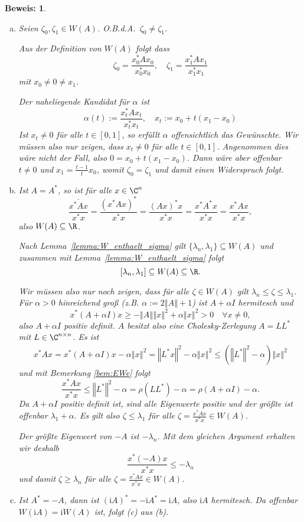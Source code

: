 \documentclass[
]{mycourse}
\theoremstyle{mythm}
\theoremstyle{break}
\newtheorem*{beweis}{Beweis:}
\newcommand{\norm}[1]{\left\Vert#1\right\Vert}		%
\renewcommand{\im}{\ensuremath{\mathrm{i}}} 			      	%
\begin{document}
\begin{beweis}
\begin{enumerate}[(a)]
\item Seien $\zeta_0, \zeta_1\in W(A)$. O.B.d.A.\ $\zeta_0\neq \zeta_1$. 

Aus der Definition von $W(A)$ folgt dass
\[
\zeta_0=\frac{x_0^* A x_0}{x_0^*x_0}, \quad \zeta_1=\frac{x_1^* A x_1}{x_1^*x_1}
\]
mit $x_0\neq 0 \neq x_1$. 

Der naheliegende Kandidat für $\alpha$ ist
\[
\alpha(t):=\frac{x_t^* A x_t}{x_t^*x_t}, \quad x_t:=x_0+t(x_1-x_0)
\]
Ist $x_t\neq 0$ für alle $t\in [0,1]$, so erfüllt $\alpha$ offensichtlich das Gewünschte.
Wir müssen also nur zeigen, dass $x_t\neq 0$ für alle $t\in [0,1]$.
Angenommen dies wäre nicht der Fall, also $0=x_0+t(x_1-x_0)$. Dann wäre 
aber offenbar $t\neq 0$ und $x_1=\frac{t-1}{t} x_0$, womit $\zeta_0=\zeta_1$ und damit 
einen Widerspruch folgt.
%
\item Ist $A=A^*$, so ist für alle $x\in \C^n$
\[
\overline{\frac{x^* A x}{x^*x}}=\frac{( x^* A x )^*}{x^*x}
= \frac{ (A x)^* x}{x^*x}=\frac{ x^* A^* x}{x^*x}
=\frac{ x^* A x}{x^*x},
\]
also $W(A)\subseteq \R$.

Nach Lemma~\ref{lemma:W_enthaelt_sigma} gilt $\{\lambda_n,\lambda_1\}\subseteq W(A)$ und
zusammen mit Lemma~\ref{lemma:W_enthaelt_sigma} folgt 
\[
[\lambda_n,\lambda_1]\subseteq W(A)\subseteq \R.
\] 
 
Wir müssen also nur noch zeigen, dass für alle $\zeta\in W(A)$ gilt $\lambda_n\leq \zeta\leq \lambda_1$.
Für $\alpha>0$ hinreichend groß (z.B. $\alpha:=2\norm{A}+1$) ist $A+\alpha I$ hermitesch und 
\[
x^*(A+\alpha I)x\geq -\norm{A}\norm{x}^2 + \alpha \norm{x}^2>0 \quad \forall x\neq 0,
\]
also $A+\alpha I$ positiv definit. $A$ besitzt also eine Cholesky-Zerlegung $A=LL^*$ mit $L\in \C^{n\times n}$.
Es ist
\begin{align*}
x^*A x = x^* (A+\alpha I) x- \alpha \norm{x}^2= \norm{L^*x}^2 - \alpha \norm{x}^2\leq (\norm{L^*}^2-\alpha)\norm{x}^2
\end{align*}
und mit Bemerkung \ref{bem:EWe} folgt
\[
\frac{x^*A x}{x^* x} \leq \norm{L^*}^2-\alpha=\rho(LL^*)-\alpha=\rho(A+\alpha I)-\alpha.
\]
Da $A+\alpha I$ positiv definit ist, sind alle Eigenwerte positiv und der größte ist offenbar $\lambda_1+\alpha$.
Es gilt also $\zeta\leq \lambda_1$ für alle $\zeta=\frac{x^*A x}{x^* x}\in W(A)$. 

Der größte Eigenwert von $-A$ ist $-\lambda_n$. Mit dem gleichen Argument erhalten wir deshalb
\[
\frac{x^* (-A) x}{x^* x} \leq -\lambda_n
\]
und damit $\zeta\geq \lambda_n$ für alle $\zeta=\frac{x^*A x}{x^* x}\in W(A)$.

\item Ist $A^*=-A$, dann ist $(\im A)^*=-\im A^*=\im A$, also $\im A$ hermitesch. Da offenbar $W(\im A)=\im W(A)$ ist, folgt (c) aus (b).
\end{enumerate}
\end{beweis}
\end{document}
